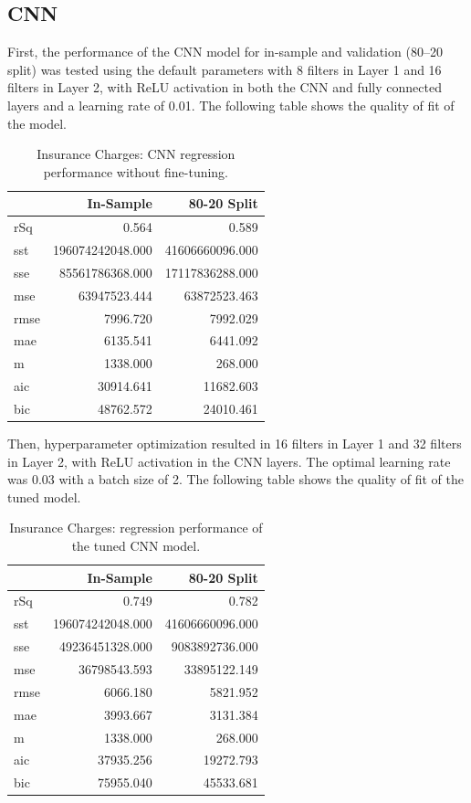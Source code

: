 \documentclass{article}
\begin{document}
\subsection{CNN}

First, the performance of the CNN model for in-sample and validation (80–20 split) was tested using the default parameters with 8 filters in Layer 1 and 16 filters in Layer 2, with ReLU activation in both the CNN and fully connected layers and a learning rate of 0.01. The following table shows the quality of fit of the model.

\begin{table}[H]
\centering
\caption{Insurance Charges: CNN regression performance without fine-tuning.}
\label{tab:Insurance_Charges_(In-Sample)}
\begin{tabular}{lrr}
\toprule
 & In-Sample & 80-20 Split \\
\midrule
rSq & 0.564 & 0.589 \\
sst & 196074242048.000 & 41606660096.000 \\
sse & 85561786368.000 & 17117836288.000 \\
mse & 63947523.444 & 63872523.463 \\
rmse & 7996.720 & 7992.029 \\
mae & 6135.541 & 6441.092 \\
m & 1338.000 & 268.000 \\
aic & 30914.641 & 11682.603 \\
bic & 48762.572 & 24010.461 \\
\bottomrule
\end{tabular}
\end{table}

Then, hyperparameter optimization resulted in 16 filters in Layer 1 and 32 filters in Layer 2, with ReLU activation in the CNN layers. The optimal learning rate was 0.03 with a batch size of 2. The following table shows the quality of fit of the tuned model.

\begin{table}[H]
\centering
\caption{Insurance Charges: regression performance of the tuned CNN model.}
\label{tab:Insurance_Charges_(In-Sample)}
\begin{tabular}{lrr}
\toprule
 & In-Sample & 80-20 Split \\
\midrule
rSq & 0.749 & 0.782 \\
sst & 196074242048.000 & 41606660096.000 \\
sse & 49236451328.000 & 9083892736.000 \\
mse & 36798543.593 & 33895122.149 \\
rmse & 6066.180 & 5821.952 \\
mae & 3993.667 & 3131.384 \\
m & 1338.000 & 268.000 \\
aic & 37935.256 & 19272.793 \\
bic & 75955.040 & 45533.681 \\
\bottomrule
\end{tabular}
\end{table}
\end{document}

